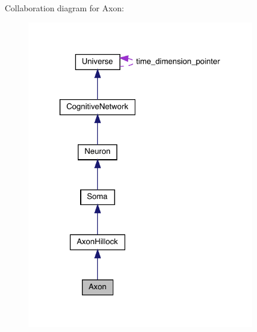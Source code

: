Collaboration diagram for Axon\+:\nopagebreak
\begin{figure}[H]
\begin{center}
\leavevmode
\includegraphics[width=283pt]{class_axon__coll__graph}
\end{center}
\end{figure}
